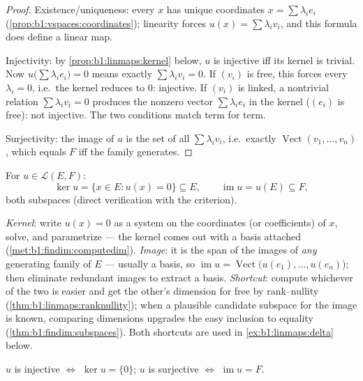 \begin{proof}
Existence/uniqueness: every $x$ has unique coordinates $x = \sum
\lambda_i e_i$ (\cref{prop:b1:vspaces:coordinates}); linearity
forces $u(x) = \sum \lambda_i v_i$, and this formula does define a
linear map.

Injectivity: by \cref{prop:b1:linmaps:kernel} below, $u$ is
injective iff its kernel is trivial. Now $u\bigl(\sum\lambda_i
e_i\bigr) = 0$ means exactly $\sum\lambda_i v_i = 0$. If $(v_i)$
is free, this forces every $\lambda_i = 0$, i.e.\ the kernel
reduces to $0$: injective. If $(v_i)$ is linked, a nontrivial
relation $\sum\lambda_i v_i = 0$ produces the nonzero vector
$\sum\lambda_i e_i$ in the kernel ($(e_i)$ is free): not
injective. The two conditions match term for term.

Surjectivity: the image of $u$ is the set of all $\sum\lambda_i
v_i$, i.e.\ exactly $\operatorname{Vect}(v_1, \dots, v_n)$, which
equals $F$ iff the family generates.
\end{proof}

\begin{definition}\label{def:b1:linmaps:kerim}
For $u \in \mathcal{L}(E, F)$:
\[
\ker u = \{x \in E : u(x) = 0\} \subseteq E,
\qquad
\operatorname{im} u = u(E) \subseteq F ,
\]
both subspaces (direct verification with the
criterion).
\end{definition}

\begin{method}
\label{met:b1:linmaps:kerim}
\emph{Kernel}: write $u(x) = 0$ as a system on the coordinates
(or coefficients) of $x$, solve, and parametrize --- the kernel
comes out with a basis attached
(\cref{met:b1:findim:computedim}). \emph{Image}: it is the span
of the images of \emph{any} generating family of $E$ ---
usually a basis, so $\operatorname{im} u =
\operatorname{Vect}\bigl(u(e_1), \dots, u(e_n)\bigr)$; then
eliminate redundant images to extract a basis. \emph{Shortcut}:
compute whichever of the two is easier and get the other's
dimension for free by rank--nullity
(\cref{thm:b1:linmaps:ranknullity}); when a plausible candidate
subspace for the image is known, comparing dimensions upgrades
the easy inclusion to equality
(\cref{thm:b1:findim:subspaces}). Both shortcuts are used in
\cref{ex:b1:linmaps:delta} below.
\end{method}

\begin{proposition}\label{prop:b1:linmaps:kernel}
$u$ is injective $\iff$ $\ker u = \{0\}$; $u$ is surjective $\iff$
$\operatorname{im} u = F$.
\end{proposition}

